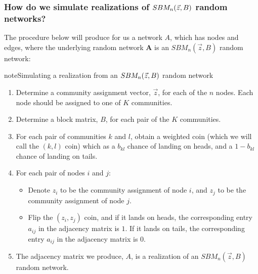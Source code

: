 \documentclass[letterpaper,10pt,english]{jupyterBook}
\begin{document}
\subsubsection{How do we simulate realizations of \protect\(SBM_n(\vec z, B)\protect\) random networks?}
\label{\detokenize{representations/ch5/single-network-models_SBM:how-do-we-simulate-realizations-of-sbm-n-vec-z-b-random-networks}}
\sphinxAtStartPar
The procedure below will produce for us a network \(A\), which has nodes and edges, where the underlying random network \(\mathbf A\) is an \(SBM_n(\vec z, B)\) random network:

\begin{sphinxadmonition}{note}{Simulating a realization from an \protect\(SBM_n(\vec z, B)\protect\) random network}
\begin{enumerate}
%
\item {} 
\sphinxAtStartPar
Determine a community assignment vector, \(\vec z\), for each of the \(n\) nodes. Each node should be assigned to one of \(K\) communities.

\item {} 
\sphinxAtStartPar
Determine a block matrix, \(B\), for each pair of the \(K\) communities.

\item {} 
\sphinxAtStartPar
For each pair of communities \(k\) and \(l\), obtain a weighted coin (which we will call the \((k,l)\) coin) which as a \(b_{kl}\) chance of landing on heads, and a \(1 - b_{kl}\) chance of landing on tails.

\item {} 
\sphinxAtStartPar
For each pair of nodes \(i\) and \(j\):
\begin{itemize}
\item {} 
\sphinxAtStartPar
Denote \(z_i\) to be the community assignment of node \(i\), and \(z_j\) to be the community assignment of node \(j\).

\item {} 
\sphinxAtStartPar
Flip the \((z_i, z_j)\) coin, and if it lands on heads, the corresponding entry \(a_{ij}\) in the adjacency matrix is \(1\). If it lands on tails, the corresponding entry \(a_{ij}\) in the adjacency matrix is \(0\).

\end{itemize}

\item {} 
\sphinxAtStartPar
The adjacency matrix we produce, \(A\), is a realization of an \(SBM_n(\vec z, B)\) random network.

\end{enumerate}
\end{sphinxadmonition}
\end{document}
